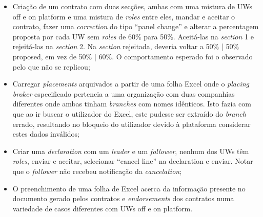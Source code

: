         \begin{itemize}
            \item Criação de um contrato com duas secções, ambas com uma mistura de UWs off e on platform e uma mistura de \textit{roles} entre eles, mandar e aceitar o contrato, fazer uma \textit{correction} do tipo ``panel change'' e alterar a percentagem proposta por cada UW sem \textit{roles} de 60\% para 50\%. Aceitá-las na \textit{section} 1 e rejeitá-las na \textit{section} 2. Na \textit{section} rejeitada, deveria voltar a 50\% | 50\% proposed, em vez de 50\% | 60\%. O comportamento esperado foi o observado pelo que não se replicou;
            \item Carregar \textit{placements} arquivados a partir de uma folha Excel onde o \textit{placing broker} especificado pertencia a uma organização com duas companhias diferentes onde ambas tinham \textit{branches} com nomes idênticos. Isto fazia com que ao ir buscar o utilizador do Excel, este pudesse ser extraído do \textit{branch} errado, resultando no bloqueio do utilizador devido à plataforma considerar estes dados inválidos;
            \item Criar uma \textit{declaration} com um \textit{leader} e um \textit{follower}, nenhum dos UWs têm \textit{roles}, enviar e aceitar, selecionar ``cancel line'' na declaration e enviar. Notar que o \textit{follower} não recebeu notificação da \textit{cancelation};
            \item O preenchimento de uma folha de Excel acerca da informação presente no documento gerado pelos contratos e \textit{endorsements} dos contratos numa variedade de casos diferentes com UWs off e on platform.
        \end{itemize}